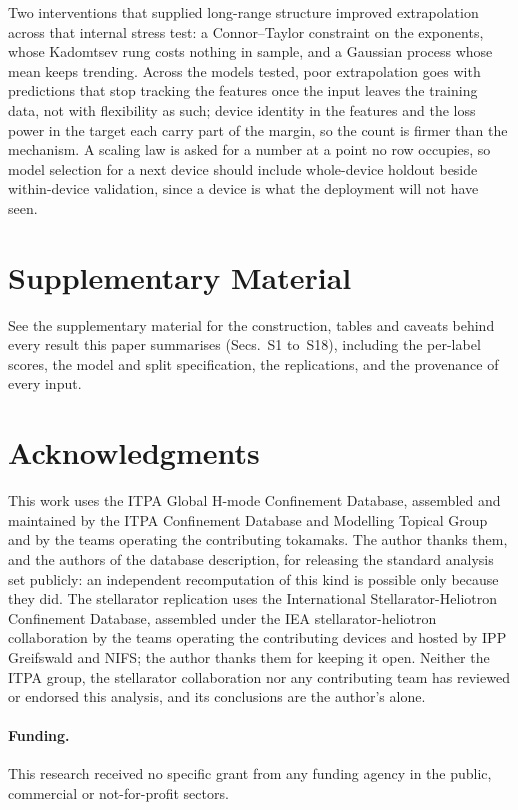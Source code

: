 \documentclass[aip,pop,preprint,amsmath,amssymb]{revtex4-2}
\begin{document}
Two interventions that supplied long-range structure improved extrapolation
across that internal stress test: a Connor--Taylor constraint on the
exponents, whose Kadomtsev rung costs nothing in sample, and a Gaussian
process whose mean keeps trending. Across the models tested, poor
extrapolation goes with predictions that stop tracking the features once the
input leaves the training data, not with flexibility as such; device identity
in the features and the loss power in the target each carry part of the
margin, so the count is firmer than the mechanism. A scaling law is asked for
a number at a point no row occupies, so model selection for a next device
should include whole-device holdout beside within-device validation, since a
device is what the deployment will not have seen.

\section*{Supplementary Material}

See the supplementary material for the construction, tables and caveats behind
every result this paper summarises (Secs.~S1 to~S18), including the per-label
scores, the model and split specification, the replications, and the provenance
of every input.

\section*{Acknowledgments}

This work uses the ITPA Global H-mode Confinement Database, assembled and
maintained by the ITPA Confinement Database and Modelling Topical Group and by
the teams operating the contributing tokamaks. The author thanks them, and the
authors of the database description\cite{hdb5}, for releasing the standard
analysis set publicly: an independent recomputation of this kind is possible
only because they did.
The stellarator replication uses the International Stellarator-Heliotron
Confinement Database, assembled under the IEA stellarator-heliotron
collaboration by the teams operating the contributing devices and hosted by IPP
Greifswald and NIFS; the author thanks them for keeping it open.
Neither the ITPA group, the stellarator collaboration nor any contributing
team has reviewed or endorsed this analysis, and its conclusions are the
author's alone.

\paragraph*{Funding.}
This research received no specific grant from any funding agency in the public,
commercial or not-for-profit sectors.
\end{document}
